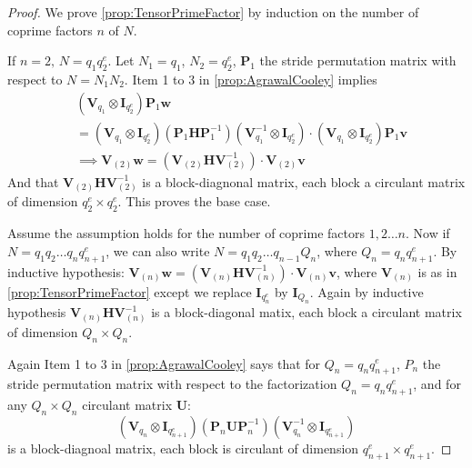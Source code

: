 \ifFullVersion
\begin{proof}
    We prove \cref{prop:TensorPrimeFactor} by induction on the number of coprime factors \(n\) of \(N\).

    If \(n = 2,\, N = q_1 q_2^e\). Let \(N_1 = q_1\), \(N_2 = q_2^e\), \(\bm{P}_1\) the stride permutation matrix with respect to \(N = N_1 N_2\). Item 1 to 3 in \cref{prop:AgrawalCooley} implies
    \begin{align*}
        &\left(\bm{V}_{q_1} \otimes \bm{I}_{q_2^e}\right) \bm{P}_1 \bm{w} \\
        &= \left(\bm{V}_{q_1} \otimes \bm{I}_{q_2^e}\right) \left(\bm{P}_1 \bm{H} \bm{P}_1^{-1}\right) \left(\bm{V}_{q_1}^{-1} \otimes \bm{I}_{q_2^e}\right) \cdot \left(\bm{V}_{q_1} \otimes \bm{I}_{q_2^e}\right) \bm{P}_1 \bm{v} \\
        &\implies \bm{V}_{(2)} \bm{w} = \left(\bm{V}_{(2)} \bm{H} \bm{V}_{(2)}^{-1}\right) \cdot \bm{V}_{(2)} \bm{v}
    \end{align*}
    And that \(\bm{V}_{(2)} \bm{H} \bm{V}_{(2)}^{-1}\) is a block-diagnonal matrix, each block a circulant matrix of dimension \(q_2^e \times q_2^e\). This proves the base case.

    Assume the assumption holds for the number of coprime factors \(1, 2 \ldots n\). Now if \(N = q_1 q_2 \ldots q_n q_{n+1}^e\), we can also write \(N = q_1 q_2 \ldots q_{n-1} Q_n\), where \(Q_n = q_n q_{n+1}^e\). By inductive hypothesis: \(\bm{V}_{(n)} \bm{w} = \left(\bm{V}_{(n)} \bm{H} \bm{V}_{(n)}^{-1}\right) \cdot \bm{V}_{(n)} \bm{v}\), where \(\bm{V}_{(n)}\) is as in \cref{prop:TensorPrimeFactor} except we replace \(\bm{I}_{q_n^e}\) by \(\bm{I}_{Q_n}\). Again by inductive hypothesis \(\bm{V}_{(n)} \bm{H} \bm{V}_{(n)}^{-1}\) is a block-diagonal matix, each block a circulant matrix of dimension \(Q_n \times Q_n\).

    Again Item 1 to 3 in \cref{prop:AgrawalCooley} says that for \(Q_n = q_n q_{n+1}^e\), \(P_n\) the stride permutation matrix with respect to the factorization \(Q_n = q_n q_{n+1}^e\), and for any \(Q_n \times Q_n\) circulant matrix \(\bm{U}\):
    \[\left(\bm{V}_{q_n} \otimes \bm{I}_{q_{n+1}^e}\right) \left(\bm{P}_n \bm{U} \bm{P}_n^{-1}\right) \left(\bm{V}_{q_n}^{-1} \otimes \bm{I}_{q_{n+1}^e}\right)\]
    is a block-diagnoal matrix, each block is circulant of dimension \(q_{n+1}^e \times q_{n+1}^e\).


\end{proof}
